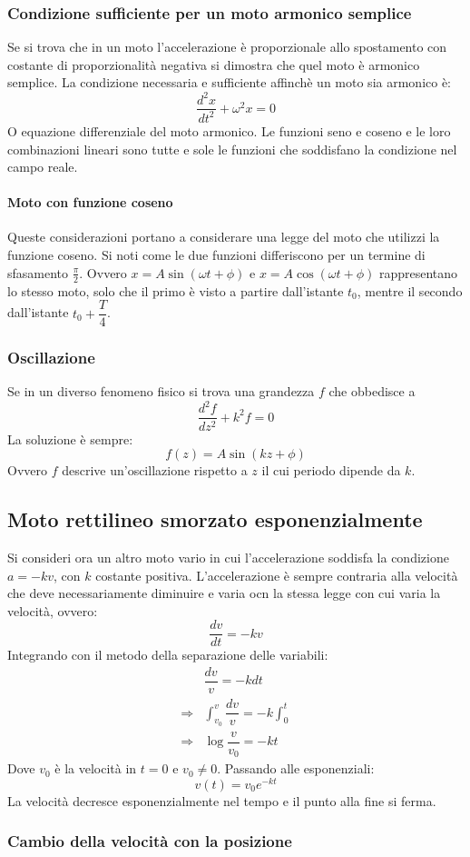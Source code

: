 		\subsubsection{Condizione sufficiente per un moto armonico semplice}
		Se si trova che in un moto l'accelerazione \`e proporzionale allo spostamento con costante di proporzionalit\`a negativa si dimostra che quel moto \`e armonico semplice.
		La condizione necessaria e sufficiente affinch\`e un moto sia armonico \`e:
		$$\dfrac{d^2x}{dt^2}+\omega^2x=0$$
		O equazione differenziale del moto armonico.
		Le funzioni seno e coseno e le loro combinazioni lineari sono tutte e sole le funzioni che soddisfano la condizione nel campo reale.

			\paragraph{Moto con funzione coseno}
			Queste considerazioni portano a considerare una legge del moto che utilizzi la funzione coseno.
			Si noti come le due funzioni differiscono per un termine di sfasamento $\frac{\pi}{2}$.
			Ovvero $x=A\sin(\omega t+\phi)$ e $x = A\cos(\omega t+\phi)$ rappresentano lo stesso moto, solo che il primo \`e visto a partire dall'istante $t_0$, mentre il secondo dall'istante $t_0 + \dfrac{T}{4}$.

		\subsubsection{Oscillazione}
		Se in un diverso fenomeno fisico si trova una grandezza $f$ che obbedisce a
		$$\dfrac{d^2f}{dz^2}+k^2f=0$$
		La soluzione \`e sempre:
		$$f(z)=A\sin(kz+\phi)$$
		Ovvero $f$ descrive un'oscillazione rispetto a $z$ il cui periodo dipende da $k$.

	\subsection{Moto rettilineo smorzato esponenzialmente}
	Si consideri ora un altro moto vario in cui l'accelerazione soddisfa la condizione $a = -kv$, con $k$ costante positiva.
	L'accelerazione \`e sempre contraria alla velocit\`a che deve necessariamente diminuire e varia ocn la stessa legge con cui varia la velocit\`a, ovvero:
	$$\dfrac{dv}{dt} = -kv$$
	Integrando con il metodo della separazione delle variabili:
	\begin{align*}
		&\dfrac{dv}{v} = -kdt\\
		\Rightarrow&\int_{v_0}^v\dfrac{dv}{v} = -k\int_0^t\\
		\Rightarrow &\log\dfrac{v}{v_0} = -kt
	\end{align*}
	Dove $v_0$ \`e la velocit\`a in $t=0$ e $v_0\neq 0$.
	Passando alle esponenziali:
	$$v(t) = v_0e^{-kt}$$
	La velocit\`a decresce esponenzialmente nel tempo e il punto alla fine si ferma.

		\subsubsection{Cambio della velocit\`a con la posizione}
